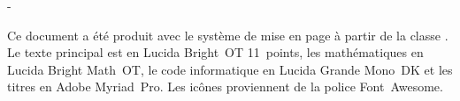 
\thispagestyle{empty}
\vspace*{\fill}

\begingroup
\calccentering{\unitlength}
\begin{adjustwidth*}{\unitlength}{-\unitlength}
  \begin{flushleft}
    \small %
    Ce document a été produit avec le système de mise en page
    {\XeLaTeX} à partir de la classe . Le texte
    principal est en Lucida Bright~OT 11~points, les mathématiques en
    Lucida Bright Math~OT, le code informatique en Lucida Grande
    Mono~DK et les titres en Adobe Myriad~Pro. Les icônes proviennent
    de la police Font~Awesome.
  \end{flushleft}
\end{adjustwidth*}
\endgroup
\vfill

